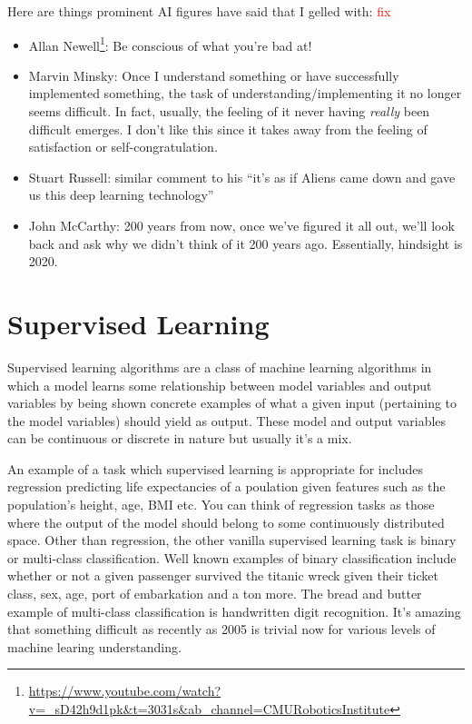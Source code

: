 \documentclass[11pt]{article}
\begin{document}
\begin{tcolorbox}[colback=c2]
    Here are things prominent AI figures have said that I gelled with: \textcolor{red}{fix}
    \begin{itemize}
        \item Allan Newell\footnote{\url{https://www.youtube.com/watch?v=_sD42h9d1pk&t=3031s&ab_channel=CMURoboticsInstitute}}: Be conscious of what you're bad at!
        \item Marvin Minsky: Once I understand something or have successfully implemented something, the task of understanding/implementing it no longer seems difficult. In fact, usually, the feeling of it never having \textit{really} been difficult emerges. I don't like this since it takes away from the feeling of satisfaction or self-congratulation.
        \item Stuart Russell: similar comment to his ``it's as if Aliens came down and gave us this deep learning technology''
        \item John McCarthy: 200 years from now, once we've figured it all out, we'll look back and ask why we didn't think of it 200 years ago. Essentially, hindsight is 2020.
    \end{itemize}
\end{tcolorbox}

\section{Supervised Learning}

Supervised learning algorithms are a class of machine learning algorithms in which a model learns some relationship between model variables and output variables by being shown concrete examples of what a given input (pertaining to the model variables) should yield as output. These model and output variables can be continuous or discrete in nature but usually it's a mix.

An example of a task which supervised learning is appropriate for includes regression predicting life expectancies of a poulation given features such as the population's height, age, BMI etc. You can think of regression tasks as those where the output of the model should belong to some continuously distributed space. Other than regression, the other vanilla supervised learning task is binary or multi-class classification. Well known examples of binary classification include whether or not a given passenger survived the titanic wreck given their ticket class, sex, age, port of embarkation and a ton more. The bread and butter example of multi-class classification is handwritten digit recognition. It's amazing that something difficult as recently as 2005 is trivial now for various levels of machine learing understanding.
\end{document}
